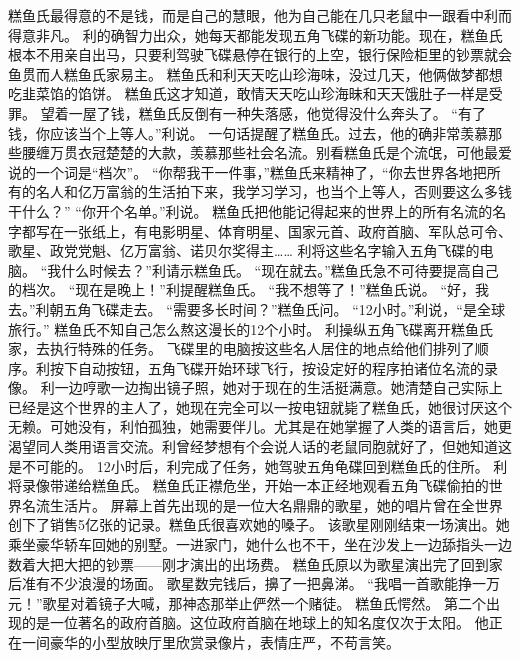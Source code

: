 \documentclass[a4paper,12pt,UTF8,twoside]{ctexbook}
\begin{document}
        糕鱼氏最得意的不是钱，而是自己的慧眼，他为自己能在几只老鼠中一跟看中利而得意非凡。 
        利的确智力出众，她每天都能发现五角飞碟的新功能。现在，糕鱼氏根本不用亲自出马，只要利驾驶飞碟悬停在银行的上空，银行保险柜里的钞票就会鱼贯而人糕鱼氏家易主。 
        糕鱼氏和利天天吃山珍海味，没过几天，他俩做梦都想吃韭菜馅的馅饼。 
        糕鱼氏这才知道，敢情天天吃山珍海昧和天天饿肚子一样是受罪。 
        望着一屋了钱，糕鱼氏反倒有一种失落感，他觉得没什么奔头了。 
        “有了钱，你应该当个上等人。”利说。 
        一句话提醒了糕鱼氏。过去，他的确非常羡慕那些腰缠万贯衣冠楚楚的大款，羡慕那些社会名流。别看糕鱼氏是个流氓，可他最爱说的一个词是“档次”。 
        “你帮我干一件事，”糕鱼氏来精神了，“你去世界各地把所有的名人和亿万富翁的生活拍下来，我学习学习，也当个上等人，否则要这么多钱干什么？” 
        “你开个名单。”利说。 
        糕鱼氏把他能记得起来的世界上的所有名流的名字都写在一张纸上，有电影明星、体育明星、国家元首、政府首脑、军队总可令、歌星、政党党魁、亿万富翁、诺贝尔奖得主…… 
        利将这些名字输入五角飞碟的电脑。 
        “我什么时候去？”利请示糕鱼氏。 
        “现在就去。”糕鱼氏急不可待要提高自己的档次。 
        “现在是晚上！”利提醒糕鱼氏。 
        “我不想等了！”糕鱼氏说。 
        “好，我去。”利朝五角飞碟走去。 
        “需要多长时间？”糕鱼氏问。 
        “12小时。”利说，“是全球旅行。” 
        糕鱼氏不知自己怎么熬这漫长的12个小时。 
        利操纵五角飞碟离开糕鱼氏家，去执行特殊的任务。 
        飞碟里的电脑按这些名人居住的地点给他们排列了顺序。利按下自动按钮，五角飞碟开始环球飞行，按设定好的程序拍诸位名流的录像。 
        利一边哼歌一边掏出镜子照，她对于现在的生活挺满意。她清楚自己实际上已经是这个世界的主人了，她现在完全可以一按电钮就毙了糕鱼氏，她很讨厌这个无赖。可她没有，利怕孤独，她需要伴儿。尤其是在她掌握了人类的语言后，她更渴望同人类用语言交流。利曾经梦想有个会说人话的老鼠同胞就好了，但她知道这是不可能的。 
        12小时后，利完成了任务，她驾驶五角龟碟回到糕鱼氏的住所。 
        利将录像带递给糕鱼氏。 
        糕鱼氏正襟危坐，开始一本正经地观看五角飞碟偷拍的世界名流生活片。 
        屏幕上首先出现的是一位大名鼎鼎的歌星，她的唱片曾在全世界创下了销售5亿张的记录。糕鱼氏很喜欢她的嗓子。 
        该歌星刚刚结束一场演出。她乘坐豪华轿车回她的别墅。一进家门，她什么也不干，坐在沙发上一边舔指头一边数着大把大把的钞票——刚才演出的出场费。 
        糕鱼氏原以为歌星演出完了回到家后准有不少浪漫的场面。 
        歌星数完钱后，擤了一把鼻涕。 
        “我唱一首歌能挣一万元！”歌星对着镜子大喊，那神态那举止俨然一个赌徒。 
        糕鱼氏愕然。 
        第二个出现的是一位著名的政府首脑。这位政府首脑在地球上的知名度仅次于太阳。 
        他正在一间豪华的小型放映厅里欣赏录像片，表情庄严，不苟言笑。 
\end{document}

